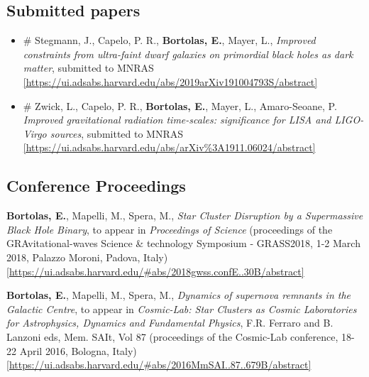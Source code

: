 \documentclass[11pt,a4paper]{article}
\begin{document}
\subsection*{ Submitted papers }

\begin{itemize}
\setlength\itemsep{-1pt}
\item  \# Stegmann, J., Capelo, P. R.,  {\bf Bortolas, E.}, Mayer, L., { \it Improved constraints from ultra-faint dwarf galaxies on primordial black holes as dark matter}, submitted to MNRAS \\ \href{https://ui.adsabs.harvard.edu/abs/2019arXiv191004793S/abstract}{\scriptsize [https://ui.adsabs.harvard.edu/abs/2019arXiv191004793S/abstract]}

\item  \# Zwick, L., Capelo, P. R., \textbf{Bortolas, E.}, Mayer, L., Amaro-Seoane, P. { \it Improved gravitational radiation time-scales: significance for LISA and LIGO-Virgo sources}, submitted to MNRAS \\ \href{https://ui.adsabs.harvard.edu/abs/arXiv\%3A1911.06024/abstract}{\scriptsize [https://ui.adsabs.harvard.edu/abs/arXiv\%3A1911.06024/abstract]}
\end{itemize}


\subsection*{Conference Proceedings }



\begin{etaremune}

\item {\bf Bortolas, E.}, Mapelli, M., Spera, M., {\it Star Cluster Disruption by a Supermassive Black Hole Binary}, to appear in {\it Proceedings of Science}  (proceedings of the  GRAvitational-waves Science \& technology Symposium - GRASS2018, 1-2 March 2018, Palazzo Moroni, Padova, Italy) \\ \href{https://ui.adsabs.harvard.edu/#abs/2018gwss.confE..30B/abstract}{\scriptsize [https://ui.adsabs.harvard.edu/\#abs/2018gwss.confE..30B/abstract]}




\item {\bf Bortolas, E.}, Mapelli, M., Spera, M., {\it Dynamics of supernova remnants in the Galactic Centre}, to appear in {\it Cosmic-Lab: Star Clusters as Cosmic Laboratories for Astrophysics, Dynamics and Fundamental Physics}, F.R. Ferraro and B. Lanzoni eds, Mem. SAIt, Vol 87 (proceedings of the Cosmic-Lab conference, 18-22 April 2016, Bologna, Italy)\\ \href{https://ui.adsabs.harvard.edu/#abs/2016MmSAI..87..679B/abstract}{\scriptsize [https://ui.adsabs.harvard.edu/\#abs/2016MmSAI..87..679B/abstract]}



\end{etaremune}
\end{document}
